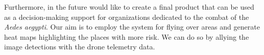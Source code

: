 Furthermore, in the future would like to create a final product that can be used as a decision-making support for organizations dedicated to the combat of the \textit{Aedes aegypti}.
Our aim is to employ the system for flying over areas and generate heat maps highlighting the places with more risk.
We can do so by allying the image detections with the drone telemetry data.

%
%
